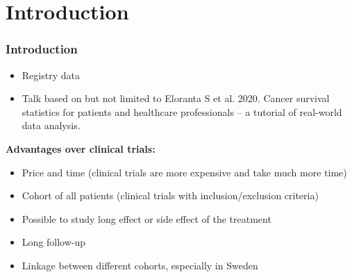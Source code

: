 \documentclass{beamer}
\begin{document}
\section{Introduction}
\begin{frame}
\frametitle{Introduction}
\begin{itemize}
\item Registry data
\item Talk based on but not limited to Eloranta S et al. 2020. Cancer survival statistics for patients and healthcare professionals – a tutorial of real-world data analysis.
\end{itemize}


\textbf{Advantages over clinical trials:}
 \begin{itemize}
 \item Price and time (clinical trials are more expensive and take much more time)
 \item Cohort of all patients (clinical trials with inclusion/exclusion criteria)
 \item Possible to study long effect or side effect of the treatment 
 \item Long follow-up 
 \item Linkage between different cohorts, especially in Sweden
 \end{itemize}
\end{frame}
\end{document}
